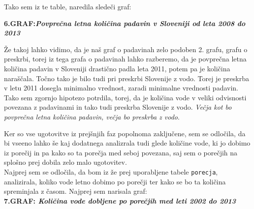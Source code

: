 \documentclass[11pt,a4paper]{article}
\begin{document}
Tako sem iz te table, naredila sledeči graf:
\newpage

\textbf{6.GRAF:\emph{Povprečna letna količina padavin v Sloveniji od leta 2008 do 2013}}


Že takoj lahko vidimo, da je naš graf o padavinah zelo podoben 2. grafu, grafu o preskrbi, torej iz tega grafa o padavinah lahko razberemo, da je povprečna letna količina padavin v Sloveniji drastično padla leta 2011, potem pa je količina naraščala. Točno tako je bilo tudi pri preskrbi Slovenije z vodo. Torej je preskrba v letu 2011 dosegla minimalno vrednost, zaradi minimalne vrednosti padavin.  Tako sem zgornjo hipotezo potrdila, torej, da je količina vode v veliki odvisnosti povezana z padavinami in tako tudi preskrba Slovenije z vodo. \emph{Večja kot bo povprečna letna količina padavin, večja bo preskrba z vodo}.

\newpage

Ker so vse ugotovitve iz prejšnjih faz popolnoma zaključene, sem se odločila, da bi vseeno lahko še kaj dodatnega analizrala tudi glede količine vode, ki jo dobimo iz porečij in pa kako so ta porečja med seboj povezana, saj sem o porečjih na splošno prej dobila zelo malo ugotovitev.\\

Najprej sem se odločila, da bom iz že prej uporabljene tabele \verb|porecja|, analizirala, koliko vode letno dobimo po porečji ter kako se bo ta količina spreminjala z časom. Najprej sem narisala graf:\\
\textbf{7.GRAF: \emph{Količina vode dobljene po porečjih med leti 2002 do 2013}}

\end{document}
